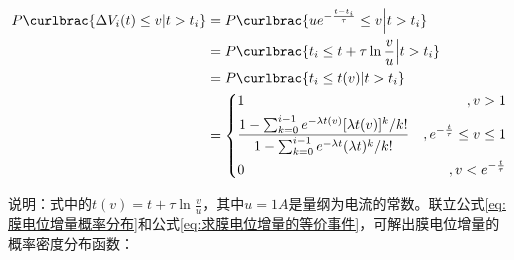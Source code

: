 \documentclass[11pt]{article}
\begin{document}
\begin{align}
  \begin{aligned}
    P\curlbrac{\Delta V_i(t)\le v|t> t_i} & =P\curlbrac{ue^{-\frac{t-t_i}{\tau}}\le v\Big|t> t_i}                                                                                                                     \\
                                          & = P\curlbrac{t_i\le t+\tau\ln\frac{v}{u}\Big|t> t_i}                                                                                                                      \\
                                          & =P\curlbrac{t_i\le t(v)|t> t_i}                                                                                                                                           \\
                                          & =\left\{\begin{aligned}
                                                       & 1                                                                                                                                     & ,v>1                   \\
                                                       & \displaystyle\frac{1-\sum_{k=0}^{i-1}e^{-\lambda t(v)}{[\lambda t(v)]^k}/{k!}}{1-\sum_{k=0}^{i-1}e^{-\lambda t}{(\lambda t)^k}/{k!} }
                                                       & ,e^{-\frac{t}{\tau}}\le v\le 1                                                                                                                                 \\
                                                       & 0                                                                                                                                     & ,v<e^{-\frac{t}{\tau}}
                                                    \end{aligned} \right.
  \end{aligned}\label{eq:求膜电位增量的等价事件}
\end{align}\par
说明：式中的$\displaystyle t(v)=t+\tau\ln\frac{v}{u}$，其中$u=1\unit{A}$是量纲为电流的常数。联立公式\ref{eq:膜电位增量概率分布}和公式\ref{eq:求膜电位增量的等价事件}，可解出膜电位增量的概率密度分布函数：
\end{document}
